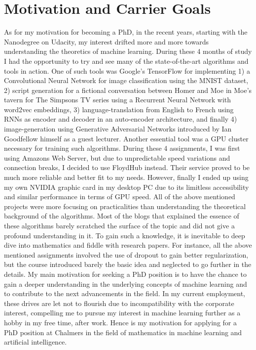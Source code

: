 \documentclass[12pt]{article}
\begin{document}
\section*{Motivation and Carrier Goals}
\label{sec:motivation}
As for my motivation for becoming a PhD, in the recent years, starting with the Nanodegree on Udacity, my interest drifted more and more towards understanding the theoretics of machine learning. During these 4 months of study I had the opportunity to try and see many of the state-of-the-art algorithms and tools in action. One of such tools was Google's TensorFlow for implementing 1) a Convolutional Neural Network for image classification using the MNIST dataset, 2) script generation for a fictional conversation between Homer and Moe in Moe's tavern for The Simpsons TV series using a Recurrent Neural Network with word2vec embeddings, 3) language-translation from English to French using RNNs as encoder and decoder in an auto-encoder architecture, and finally 4) image-generation using Generative Adversarial Networks introduced by Ian Goodfellow himself as a guest lecturer.
Another essential tool was a GPU cluster necessary for training such algorithms. During these 4 assignments, I was first using Amazons Web Server, but due to unpredictable speed variations and connection breaks, I decided to use FloydHub instead. Their service proved to be much more reliable and better fit to my needs. However, finally I ended up using my own NVIDIA graphic card in my desktop PC due to its limitless accessibility and similar performance in terms of GPU speed.
All of the above mentioned projects were more focusing on practicalities than understanding the theoretical background of the algorithms. Most of the blogs that explained the essence of these algorithms barely scratched the surface of the topic and did not give a profound understanding in it. To gain such a knowledge, it is inevitable to deep dive into mathematics and fiddle with research papers. For instance, all the above mentioned assignments involved the use of dropout to gain better regularization, but the course introduced barely the basic idea and neglected to go further in the details. My main motivation for seeking a PhD position is to have the chance to gain a deeper understanding in the underlying concepts of machine learning and to contribute to the next advancements in the field. In my current employment, these drives are let not to flourish due to incompatibility with the corporate interest, compelling me to pursue my interest in machine learning further as a hobby in my free time, after work. Hence is my motivation for applying for a PhD position at Chalmers in the field of mathematics in machine learning and artificial intelligence.
\end{document}
